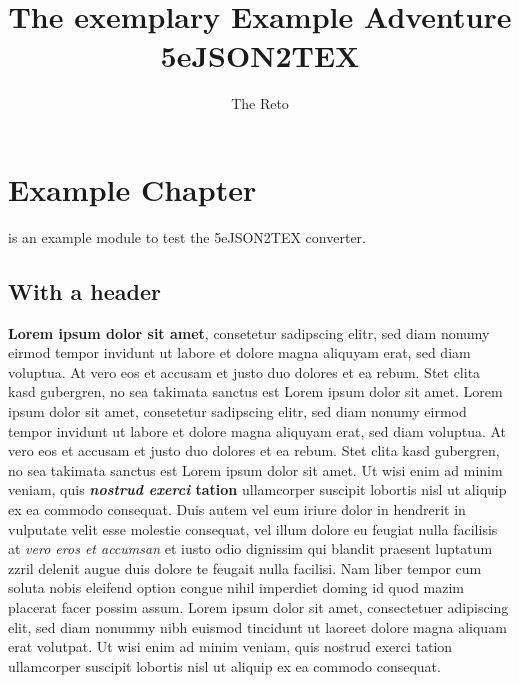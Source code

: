 \documentclass[10pt,twoside,twocolumn,openany,nodeprecatedcode]{dndbook}
\title{The exemplary Example Adventure \\ \large 5eJSON2TEX}
\author{The Reto}
\begin{document}
\maketitle
{}
\tableofcontents
\newpage
\chapter{Example Chapter} \label{sec:Example_Chapter}
 is an example module to test the 5eJSON2TEX converter.

\section{With a header} \label{sec:With_a_header}
\textbf{Lorem ipsum dolor sit amet}, consetetur sadipscing elitr, sed diam nonumy eirmod tempor invidunt ut labore et dolore magna aliquyam erat, sed diam voluptua. At vero eos et accusam et justo duo dolores et ea rebum. Stet clita kasd gubergren, no sea takimata sanctus est Lorem ipsum dolor sit amet. Lorem ipsum dolor sit amet, consetetur sadipscing elitr, sed diam nonumy eirmod tempor invidunt ut labore et dolore magna aliquyam erat, sed diam voluptua. At vero eos et accusam et justo duo dolores et ea rebum. Stet clita kasd gubergren, no sea takimata sanctus est Lorem ipsum dolor sit amet.
Ut wisi enim ad minim veniam, quis \textbf{\textit{nostrud exerci} tation} ullamcorper suscipit lobortis nisl ut aliquip ex ea commodo consequat. Duis autem vel eum iriure dolor in hendrerit in vulputate velit esse molestie consequat, vel illum dolore eu feugiat nulla facilisis at \textit{vero eros et accumsan} et iusto odio dignissim qui blandit praesent luptatum zzril delenit augue duis dolore te feugait nulla facilisi.
Nam liber tempor cum soluta nobis eleifend option congue nihil imperdiet doming id quod mazim placerat facer possim assum. Lorem ipsum dolor sit amet, consectetuer adipiscing elit, sed diam nonummy nibh euismod tincidunt ut laoreet dolore magna aliquam erat volutpat. Ut wisi enim ad minim veniam, quis nostrud exerci tation ullamcorper suscipit lobortis nisl ut aliquip ex ea commodo consequat.
\end{document}

